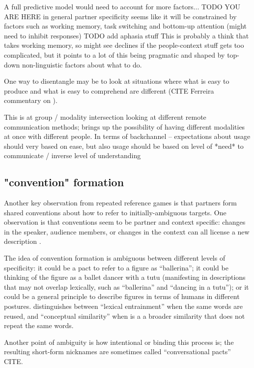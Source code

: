 \documentclass[]{article}
\begin{document}
A full predictive model would need to account for more factors... TODO YOU ARE HERE  in general partner specificity seems like it will be constrained by factors such as working memory, task switching and bottom-up attention (might need to inhibit responses) 
TODO add aphasia stuff 
 This is probably a think that takes working memory, so might see declines if the people-context stuff gets too complicated, but it points to a lot of this being pragmatic and shaped by top-down non-linguistic factors about what to do. 


One way to disentangle may be to look at situations where what is easy to produce and what is easy to comprehend are different (CITE Ferreira commentary on \cite{pickering2004}). 

This is at group / modality intersection \cite{foxtree2013} looking at different remote communication methods; brings up the possibility of having different modalities at once with different people. In terms of backchannel -- expectations about usage should very based on ease, but also usage should be based on level of *need* to communicate / inverse level of understanding 

\subsection{"convention" formation}
Another key observation from repeated reference games is that partners form shared conventions about how to refer to initially-ambiguous targets. One observation is that conventions seem to be partner and context specific: changes in the speaker, audience members, or changes in the context can all license a new description \cite{metzing2003a, ibarra2016, yoon2014}.

The idea of convention formation is ambiguous between different levels of specificity: it could be a pact to refer to a figure as ``ballerina''; it could be thinking of the figure as a ballet dancer with a tutu (manifesting in descriptions that may not overlap lexically, such as ``ballerina'' and ``dancing in a tutu''); or it could be a general principle to describe figures in terms of humans in different postures. 
\cite{horton2002a} distinguishes between ``lexical entrainment'' when the same words are reused, and ``conceptual similarity'' when is a a broader similarity that does not repeat the same words. 

Another point of ambiguity is how intentional or binding this process is; the resulting short-form nicknames are sometimes called ``conversational pacts'' CITE. 
\end{document}
